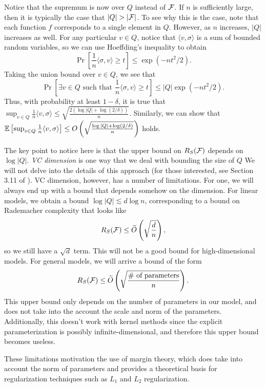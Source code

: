 Notice that the supremum is now over $Q$ instead of $\mathcal F$. If $n$ is sufficiently large, then it is typically the case that $|Q|>|\cF|$. To see why this is the case, note that each function $f$ corresponds to a single element in $Q$. However, as $n$ increases, $|Q|$ increases as well. For any particular $v\in Q$, notice that $\langle v, \sigma\rangle$ is a sum of bounded random variables, so we can use Hoeffding's inequality to obtain
\begin{equation}
\Pr\left[\frac{1}{n}\langle\sigma, v\rangle\geq t\right] \leq \exp (-n t^2 / 2).
\end{equation}
Taking the union bound over $v\in Q$, we see that 
\begin{equation}
\Pr\left[\exists v\in Q \text{ such that } \frac{1}{n}\langle\sigma, v\rangle \geq t\right] \leq |Q| \exp (-nt^2 / 2).
\end{equation}
Thus, with probability at least $1-\delta$, it is true that $\sup _{v \in Q} \frac{1}{n}\langle v, \sigma \rangle \leq \sqrt{\frac{2(\log|Q| + \log (2/\delta))}{n}}$. Similarly, we can show that $\operatorname*{\mathbb{E}} \left[ \sup _{v \in Q} \frac{1}{n}\langle v, \sigma \rangle \right] \leq O\left(\sqrt{\frac{\log|Q| + \log (2/\delta)}{n}}\right)$ holds.

The key point to notice here is that the upper bound on $R_S(\mathcal F)$ depends on $\log |Q|$. \textit{VC dimension} is one way that we deal with bounding the size of $Q$ We will not delve into the details of this approach (for those interested, see Section 3.11 of \cite{percynotes}). VC dimension, however, has a number of limitations. For one, we will always end up with a bound that depends somehow on the dimension. For linear models, we obtain a bound $\log |Q| \lesssim d \log n$, corresponding to a bound on Rademacher complexity that looks like
\begin{equation}
R_S(\mathcal F) \leq \widetilde{O} \left( \sqrt{\frac{d}{n}} \right),
\end{equation}
so we still have a $\sqrt{d}$ term. This will not be a good bound for high-dimensional models. For general models, we will arrive a bound of the form 
\begin{equation}
R_S(\mathcal F) \leq \widetilde{O} \left( \sqrt{\frac{\text{\# of parameters}}{n}} \right).
\end{equation}
This upper bound only depends on the number of parameters in our model, and does not take into the account the scale and norm of the parameters. Additionally, this doesn't work with kernel methods since the explicit parameterization is possibly infinite-dimensional, and therefore this upper bound becomes useless.

These limitations motivation the use of margin theory, which does take into account the norm of parameters and provides a theoretical basis for regularization techniques such as $L_1$ and $L_2$ regularization.